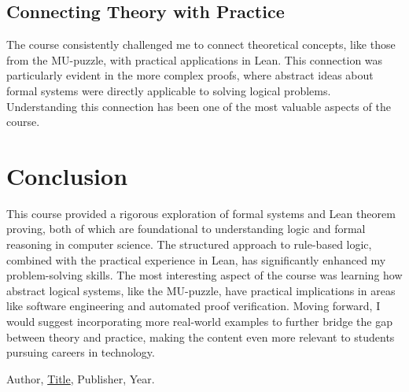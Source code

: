 \documentclass{article}
\theoremstyle{theorem}
\theoremstyle{definition}
\theoremstyle{remark}
\begin{document}
\subsection{Connecting Theory with Practice}

The course consistently challenged me to connect theoretical concepts, like those from the MU-puzzle, with practical applications in Lean. This connection was particularly evident in the more complex proofs, where abstract ideas about formal systems were directly applicable to solving logical problems. Understanding this connection has been one of the most valuable aspects of the course.

\section{Conclusion}\label{conclusion}

This course provided a rigorous exploration of formal systems and Lean theorem proving, both of which are foundational to understanding logic and formal reasoning in computer science. The structured approach to rule-based logic, combined with the practical experience in Lean, has significantly enhanced my problem-solving skills. The most interesting aspect of the course was learning how abstract logical systems, like the MU-puzzle, have practical implications in areas like software engineering and automated proof verification. Moving forward, I would suggest incorporating more real-world examples to further bridge the gap between theory and practice, making the content even more relevant to students pursuing careers in technology.

\begin{thebibliography}{99}
 Author, \href{https://en.wikipedia.org/wiki/LaTeX}{Title}, Publisher, Year.
\end{thebibliography}
\end{document}
